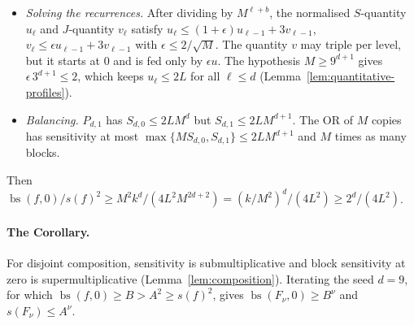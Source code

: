 \documentclass[11pt]{article}
\newcommand{\bs}{\operatorname{bs}}
\theoremstyle{definition}
\theoremstyle{remark}
\begin{document}
\begin{itemize}[leftmargin=1.5em]
 distinct predicates \(P_{\ell,q},P_{\ell,q'}\) together from \(b\) to
 \(1-b\). At level \(0\) it is zero, since one flip changes a Hamming
 distance by at most \(1\) and cannot cross two integer radii
 (Lemma~\ref{lem:base}). It obeys its own recurrences,
 \(J_{\ell,1}\le M^2J_{\ell-1,0}+rS_{\ell-1,1}\) and
 \(J_{\ell,0}\le16\,S_{\ell-1,0}+3J_{\ell-1,1}\). In the last bound even the
 exceptional clause is charged \(J_{\ell-1,1}\): making a clause hold for two
 parent indices \(q<q'\) forces two child gate predicates to change.
\item \emph{Solving the recurrences.} After dividing by \(M^{\ell+b}\), the
 normalised \(S\)-quantity \(u_\ell\) and \(J\)-quantity \(v_\ell\) satisfy
 \(u_\ell\le(1+\epsilon)u_{\ell-1}+3v_{\ell-1}\),
 \(v_\ell\le\epsilon u_{\ell-1}+3v_{\ell-1}\) with
 \(\epsilon\le 2/\sqrt M\). The quantity \(v\) may triple per level, but it
 starts at \(0\) and is fed only by \(\epsilon u\). The hypothesis
 \(M\ge 9^{d+1}\) gives \(\epsilon\,3^{d+1}\le 2\), which keeps
 \(u_\ell\le 2L\) for all \(\ell\le d\)
 (Lemma~\ref{lem:quantitative-profiles}).
\item \emph{Balancing.} \(P_{d,1}\) has \(S_{d,0}\le2LM^{d}\) but
 \(S_{d,1}\le 2LM^{d+1}\). The OR of \(M\) copies has sensitivity at most
 \(\max\{MS_{d,0},S_{d,1}\}\le 2LM^{d+1}\) and \(M\) times as many blocks.
\end{itemize}
Then
\(\bs(f,0)/s(f)^2\ge M^2k^d/(4L^2M^{2d+2})=(k/M^2)^d/(4L^2)\ge2^d/(4L^2)\).

\paragraph{The Corollary.}
For disjoint composition, sensitivity is submultiplicative and block
sensitivity at zero is supermultiplicative (Lemma~\ref{lem:composition}).
Iterating the seed \(d=9\), for which \(\bs(f,0)\ge B>A^2\ge s(f)^2\), gives
\(\bs(F_\nu,0)\ge B^\nu\) and \(s(F_\nu)\le A^\nu\).
\end{document}
